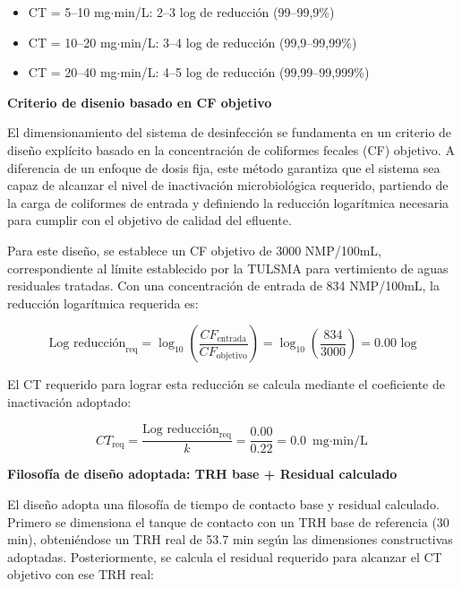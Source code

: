 \documentclass[12pt,a4paper]{article}
\begin{document}
\begin{itemize}[noitemsep,leftmargin=2em]
    \item CT = 5--10 mg$\cdot$min/L: 2--3 log de reducción (99--99,9\%)
    \item CT = 10--20 mg$\cdot$min/L: 3--4 log de reducción (99,9--99,99\%)
    \item CT = 20--40 mg$\cdot$min/L: 4--5 log de reducción (99,99--99,999\%)
\end{itemize}

\textbf{Criterio de disenio basado en CF objetivo}

El dimensionamiento del sistema de desinfección se fundamenta en un criterio de diseño explícito basado en la concentración de coliformes fecales (CF) objetivo. A diferencia de un enfoque de dosis fija, este método garantiza que el sistema sea capaz de alcanzar el nivel de inactivación microbiológica requerido, partiendo de la carga de coliformes de entrada y definiendo la reducción logarítmica necesaria para cumplir con el objetivo de calidad del efluente.

Para este diseño, se establece un CF objetivo de 3000 NMP/100mL, correspondiente al límite establecido por la TULSMA para vertimiento de aguas residuales tratadas. Con una concentración de entrada de 834 NMP/100mL, la reducción logarítmica requerida es:

\begin{equation}
\text{Log reducción}_{\text{req}} = \log_{10}\left(\frac{CF_{\text{entrada}}}{CF_{\text{objetivo}}}\right) = \log_{10}\left(\frac{834}{3000}\right) = 0.00 \text{ log}
\end{equation}

El CT requerido para lograr esta reducción se calcula mediante el coeficiente de inactivación adoptado:

\begin{equation}
CT_{\text{req}} = \frac{\text{Log reducción}_{\text{req}}}{k} = \frac{0.00}{0.22} = 0.0 \text{ mg$\cdot$min/L}
\end{equation}

\textbf{Filosofía de diseño adoptada: TRH base + Residual calculado}

El diseño adopta una filosofía de tiempo de contacto base y residual calculado. Primero se dimensiona el tanque de contacto con un TRH base de referencia (30 min), obteniéndose un TRH real de 53.7 min según las dimensiones constructivas adoptadas. Posteriormente, se calcula el residual requerido para alcanzar el CT objetivo con ese TRH real:
\end{document}
